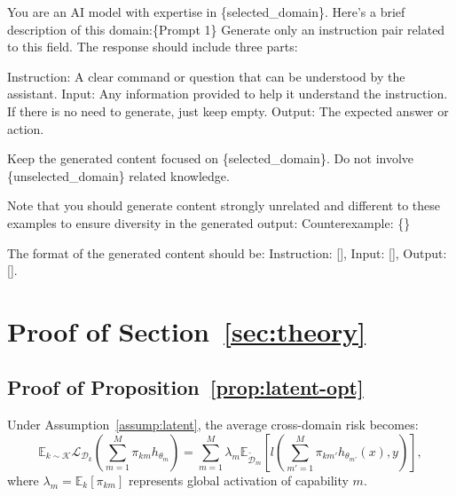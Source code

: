 \begin{promptbox}
\vspace{-0.2cm}
You are an AI model with expertise in \{selected\_domain\}. Here's a brief description of this domain:\{Prompt 1\} \newline
Generate only an instruction pair related to this field. The response should include three parts:

Instruction: A clear command or question that can be understood by the assistant.\newline
Input: Any information provided to help it understand the instruction. If there is no need to generate, just keep empty.\newline
Output: The expected answer or action.

Keep the generated content focused on \{selected\_domain\}. Do not involve \{unselected\_domain\} related knowledge.

Note that you should generate content strongly unrelated and different to these examples to ensure diversity in the generated output:\newline
Counterexample: \{\}

The format of the generated content should be: Instruction: [], Input: [], Output: [].
\end{promptbox}

\section{Proof of Section~\ref{sec:theory}}\label{sec:appendix-proof}

\subsection{Proof of Proposition~\ref{prop:latent-opt}}
\label{sec:appendix-proof-prop}

\begin{lemma}
\label{lemma:risk-decomp}
Under Assumption~\ref{assump:latent}, the average cross-domain risk becomes:
\begin{equation}
    \mathbb{E}_{k \sim \mathcal{K}} \mathcal{L}_{\mathcal{D}_k}\left(\textstyle\sum_{m=1}^M \pi_{km}h_{\theta_m}\right) = \sum_{m=1}^M \lambda_m \mathbb{E}_{\tilde{\mathcal{D}}_m}\left[l\left(\textstyle\sum_{m'=1}^M \pi_{km'}h_{\theta_{m'}}(x), y\right)\right],
\end{equation}
where \(\lambda_m = \mathbb{E}_k[\pi_{km}]\) represents global activation of capability \(m\).
\end{lemma}

